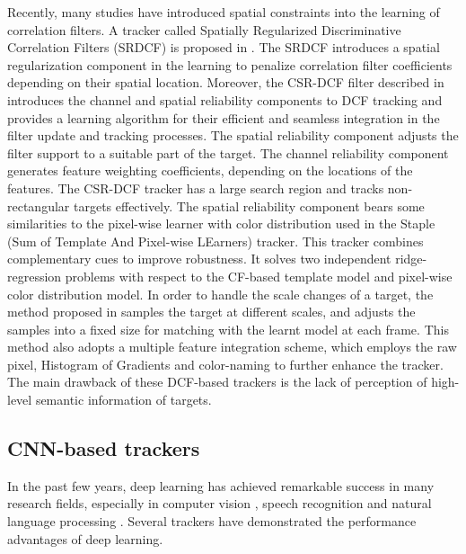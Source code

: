 \documentclass[review]{elsarticle}
\begin{document}
\begin{CJK*}{UTF8}{gbsn}
Recently, many studies \cite{Danelljan2015LearningSR, Lukezic2017DiscriminativeCF} have introduced spatial constraints into the learning of correlation filters. A tracker called Spatially Regularized Discriminative Correlation Filters (SRDCF) is proposed in \cite{Danelljan2015LearningSR}. The SRDCF introduces a spatial regularization component in the learning to penalize correlation filter coefficients depending on their spatial location.
Moreover, the CSR-DCF filter described in \cite{Lukezic2017DiscriminativeCF} introduces the channel and spatial reliability components to DCF tracking and provides a learning algorithm for their efficient and seamless integration in the filter update and tracking processes. The spatial reliability component adjusts the filter support to a suitable part of the target. The channel reliability component generates feature weighting coefficients, depending on the locations of the features. The CSR-DCF tracker has a large search region and tracks non-rectangular targets effectively. The spatial reliability component bears some similarities to the pixel-wise learner with color distribution used in the Staple (Sum of Template And Pixel-wise LEarners) \cite{Bertinetto2016StapleC} tracker. This tracker combines complementary cues to improve robustness. It solves two independent ridge-regression problems with respect to the CF-based template model and pixel-wise color distribution model.
In order to handle the scale changes of a target, the method proposed in \cite{Li2014ASA} samples the target at different scales, and adjusts the samples into a fixed size for matching with the learnt model at each frame. This method also adopts a multiple feature integration scheme, which employs the raw pixel, Histogram of Gradients \cite{Forsyth2014ObjectDW} and color-naming \cite{Weijer2009LearningCN} to further enhance the tracker. The main drawback of these DCF-based trackers is the lack of perception of high-level semantic information of targets.

\subsection{CNN-based trackers}
In the past few years, deep learning \cite{Goodfellow2015DeepL} has achieved remarkable success in many research fields, especially in computer vision \cite{Girshick2016RegionBasedCN, Schroff2015FaceNetAU}, speech recognition \cite{Kim2016JointCB, Wu2015DeepNN} and natural language processing \cite{Vinyals2014GrammarAA, Bahdanau2014NeuralMT}. Several trackers have demonstrated the performance advantages of deep learning. 


\end{CJK*}
\end{document}
